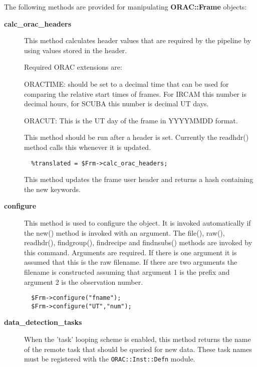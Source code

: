 The following methods are provided for manipulating
\textbf{ORAC::Frame} objects:

\begin{description}

\item[\textbf{calc\_orac\_headers}] \mbox{}

This method calculates header values that are required by the
pipeline by using values stored in the header.



Required ORAC extensions are:



ORACTIME: should be set to a decimal time that can be used for
comparing the relative start times of frames. For IRCAM this
number is decimal hours, for SCUBA this number is decimal
UT days.



ORACUT: This is the UT day of the frame in YYYYMMDD format.



This method should be run after a header is set. Currently the readhdr()
method calls this whenever it is updated.

\begin{verbatim}
  %translated = $Frm->calc_orac_headers;
\end{verbatim}


This method updates the frame user header and returns a hash
containing the new keywords.


\item[\textbf{configure}] \mbox{}

This method is used to configure the object. It is invoked
automatically if the new() method is invoked with an argument. The
file(), raw(), readhdr(), findgroup(), findrecipe and findnsubs()
methods are invoked by this command. Arguments are required.  If there
is one argument it is assumed that this is the raw filename. If there
are two arguments the filename is constructed assuming that argument 1
is the prefix and argument 2 is the observation number.

\begin{verbatim}
  $Frm->configure("fname");
  $Frm->configure("UT","num");
\end{verbatim}

\item[\textbf{data\_detection\_tasks}] \mbox{}

When the 'task' looping scheme is enabled, this method returns the name
of the remote task that should be queried for new data. These task names
must be registered with the \texttt{ORAC::Inst::Defn} module.


\end{description}
